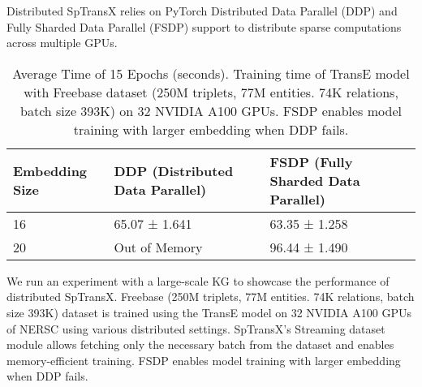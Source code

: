 Distributed SpTransX relies on PyTorch Distributed Data Parallel (DDP) and Fully Sharded Data Parallel (FSDP) support to distribute sparse computations across multiple GPUs. 

\begin{table}[h]
\centering
\caption{Average Time of 15 Epochs (seconds). Training time of TransE model with Freebase dataset (250M triplets, 77M entities. 74K relations, batch size 393K)  on 32 NVIDIA A100 GPUs. FSDP enables model training with larger embedding when DDP fails.}
\begin{tabular}{|p{2cm}|p{2.5cm}|p{2.5cm}|}
\hline
\textbf{Embedding Size} & \textbf{DDP (Distributed Data Parallel)} & \textbf{FSDP (Fully Sharded Data Parallel)} \\ \hline
16                      & 65.07 ± 1.641                            & 63.35 ± 1.258                               \\ \hline
20                      & Out of Memory                            & 96.44 ± 1.490                               \\ \hline
\end{tabular}
\end{table}

We run an experiment with a large-scale KG to showcase the performance of distributed SpTransX. Freebase (250M triplets, 77M entities. 74K relations, batch size 393K) dataset is trained using the TransE model on 32 NVIDIA A100 GPUs of NERSC using various distributed settings. SpTransX’s Streaming dataset module allows fetching only the necessary batch from the dataset and enables memory-efficient training. FSDP enables model training with larger embedding when DDP fails.

